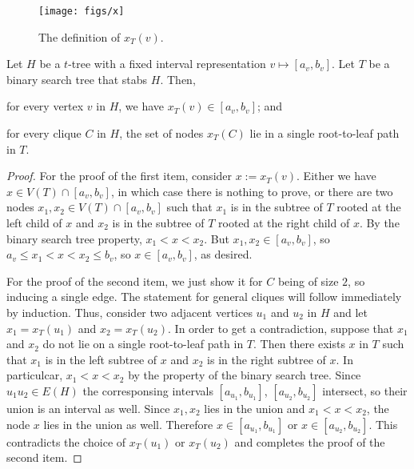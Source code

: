 \documentclass[kpfonts]{patmorin}
\let\le\leqslant
\begin{document}
\begin{figure}
  \begin{center}
    \texttt{[image: figs/x]}
  \end{center}
  \caption{The definition of $x_T(v)$.}
\end{figure}


\begin{lem}
Let $H$ be a $t$-tree with a fixed interval representation $v\mapsto[a_v,b_v]$. 
Let $T$ be a binary search tree that stabs $H$. 
Then,
\begin{compactenum}
  \item for every vertex $v$ in $H$, we have $x_{T}(v) \in [a_v,b_v]$; and
  \item for every clique $C$ in $H$, the set of nodes $x_T(C)$ lie in a single root-to-leaf path in $T$.
\end{compactenum}
\end{lem}
\begin{proof}
  For the proof of the first item, consider $x:=x_T(v)$.
  Either we have $x\in V(T)\cap[a_v,b_v]$, in which case there is nothing to prove, 
  or there are two nodes $x_1,x_2\in V(T)\cap[a_v,b_v]$ such that $x_1$ is in the subtree of $T$ rooted at the left child of $x$ and $x_2$ is in the subtree of $T$ rooted at the right child of $x$.  
  By the binary search tree property, $x_1<x<x_2$. 
  But $x_1,x_2 \in [a_v,b_v]$, so $a_v\le x_1<x<x_2\le b_v$, so $x\in [a_v,b_v]$, as desired.

  For the proof of the second item, we just show it for $C$ being of size $2$, so inducing a single edge. 
  The statement for general cliques will follow immediately by induction.
  Thus, consider two adjacent vertices $u_1$ and $u_2$ in $H$ and 
  let $x_1=x_T(u_1)$ and $x_2=x_T(u_2)$.
  In order to get a contradiction, suppose that $x_1$ and $x_2$ do not lie on a single root-to-leaf path in $T$. 
  Then there exists $x$ in $T$ such that $x_1$ is in the left subtree of $x$ and $x_2$ is in the right subtree of $x$.
  In particulcar, $x_1 < x < x_2$ by the property of the binary search tree.
  Since $u_1u_2 \in E(H)$ the corresponsing intervals $[a_{u_1},b_{u_1}]$, $[a_{u_2}, b_{u_2}]$ intersect, so their union is an interval as well. 
  Since $x_1,x_2$ lies in the union and $x_1 < x < x_2$, the node $x$ lies in the union as well.
  Therefore $x\in[a_{u_1},b_{u_1}]$ or $x\in [a_{u_2}, b_{u_2}]$. 
  This contradicts the choice of $x_T(u_1)$ or $x_T(u_2)$ and completes the proof of the second item.
\end{proof}
\end{document}
